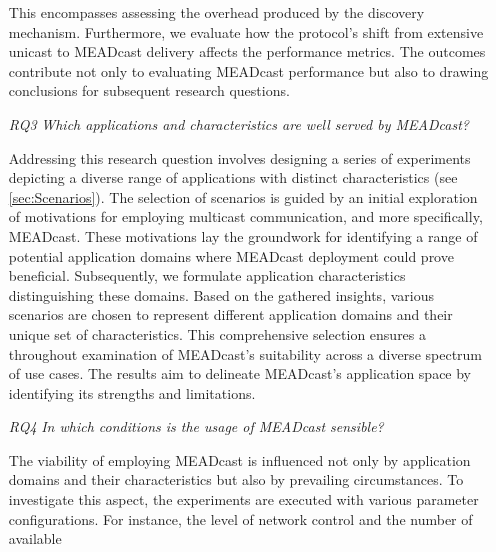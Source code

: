 \begin{enumerate}
        This encompasses assessing the overhead produced by the discovery
            mechanism.
        Furthermore, we evaluate how the protocol's shift from extensive
            unicast to MEADcast delivery affects the performance metrics.
        The outcomes contribute not only to evaluating MEADcast performance but
            also to drawing conclusions for subsequent research questions.
    \item[\textit{RQ3}]
        \textit{Which applications and characteristics are well served by
        MEADcast?}\par
        Addressing this research question involves designing a series of 
            experiments depicting a diverse range of applications with distinct
            characteristics (see \autoref{sec:Scenarios}).
        The selection of scenarios is guided by an initial exploration of
            motivations for employing multicast communication, and more
            specifically, MEADcast.
        These motivations lay the groundwork for identifying a range of
            potential application domains where MEADcast deployment could prove
            beneficial.
        Subsequently, we formulate application characteristics distinguishing
            these domains.
        Based on the gathered insights, various scenarios are chosen to
            represent different application domains and their unique set of
            characteristics.
        This comprehensive selection ensures a throughout examination of
            MEADcast's suitability across a diverse spectrum of use cases.
        The results aim to delineate MEADcast's application space by
            identifying its strengths and limitations.
    \item[\textit{RQ4}] \label{itm:RQs}
        \textit{In which conditions is the usage of MEADcast sensible?}\par
        The viability of employing MEADcast is influenced not only by
            application domains and their characteristics but also by
            prevailing circumstances.
        To investigate this aspect, the experiments are executed with various
            parameter configurations.
        For instance, the level of network control and the number of available

\end{enumerate}
